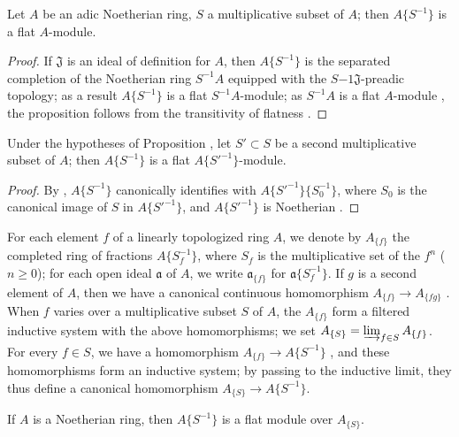 \begin{proposition}[7.6.13]
\label{0.7.6.13}
Let $A$ be an adic Noetherian ring, $S$ a multiplicative subset of $A$; then $A\{S^{-1}\}$ is a
flat $A$-module.
\end{proposition}

\begin{proof}
If $\mathfrak{J}$ is an ideal of definition for $A$, then $A\{S^{-1}\}$ is the separated completion
of the Noetherian ring $S^{-1}A$ equipped with the $S{-1}\mathfrak{J}$-preadic topology; as a result
 $A\{S^{-1}\}$ is a flat $S^{-1}A$-module; as $S^{-1}A$ is a flat
$A$-module , the proposition follows from the transitivity of flatness .
\end{proof}

\begin{corollary}[7.6.14]
\label{0.7.6.14}
Under the hypotheses of Proposition , let $S'\subset S$ be a second
multiplicative subset of $A$; then $A\{S^{-1}\}$ is a flat $A\{{S'}^{-1}\}$-module.
\end{corollary}

\begin{proof}
By , $A\{S^{-1}\}$ canonically identifies with
$A\{{S'}^{-1}\}\{S_0^{-1}\}$, where $S_0$ is the canonical image of $S$ in $A\{{S'}^{-1}\}$, and
$A\{{S'}^{-1}\}$ is Noetherian .
\end{proof}

\begin{env}[7.6.15]
\label{0.7.6.15}
For each element $f$ of a linearly topologized ring $A$, we denote by $A_{\{f\}}$ the completed
ring of fractions $A\{S_f^{-1}\}$, where $S_f$ is the multiplicative set of the $f^n$
($n\geq 0$); for each open ideal $\mathfrak{a}$ of $A$, we write $\mathfrak{a}_{\{f\}}$ for
$\mathfrak{a}\{S_f^{-1}\}$. If $g$ is a second element of $A$, then we have a canonical continuous
homomorphism $A_{\{f\}}\to A_{\{fg\}}$ . When $f$ varies over a
multiplicative subset $S$ of $A$, the $A_{\{f\}}$ form a filtered inductive system with the above
homomorphisms; we set $A_{\{S\}}=\varinjlim_{f\in S}A_{\{f\}}$. For every $f\in S$, we have a
homomorphism $A_{\{f\}}\to A\{S^{-1}\}$ , and
these homomorphisms form an inductive system; by passing to the inductive limit, they thus define
a canonical homomorphism $A_{\{S\}}\to A\{S^{-1}\}$.
\end{env}

\begin{proposition}[7.6.16]
\label{0.7.6.16}
If $A$ is a Noetherian ring, then $A\{S^{-1}\}$ is a flat module over $A_{\{S\}}$.
\end{proposition}

